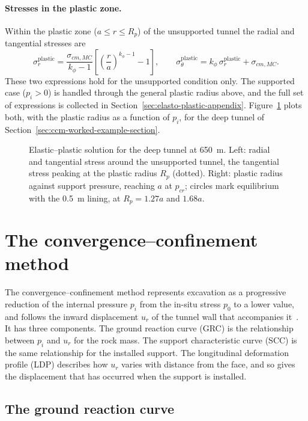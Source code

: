 \paragraph{Stresses in the plastic zone.}
Within the plastic zone ($a \leq r \leq R_p$) of the unsupported tunnel the
radial and tangential stresses are
\[
\sigma_r^{\text{plastic}} = \frac{\sigma_{cm,MC}}{k_\phi - 1}\left[\left(\frac{r}{a}\right)^{k_\phi-1} - 1\right],
\qquad
\sigma_\theta^{\text{plastic}} = k_\phi\,\sigma_r^{\text{plastic}} + \sigma_{cm,MC}.
\]
These two expressions hold for the unsupported condition only. The supported
case ($p_i > 0$) is handled through the general plastic radius above, and the
full set of expressions is collected in
Section~\ref{sec:elasto-plastic-appendix}. Figure~\ref{fig:plastic-zone}
plots both, with the plastic radius as a function of $p_i$, for the deep
tunnel of Section~\ref{sec:ccm-worked-example-section}.

\begin{figure}[htbp]
\centering
{}
\caption{Elastic--plastic solution for the deep tunnel at 650~m. Left: radial and tangential stress around the unsupported tunnel, the tangential stress peaking at the plastic radius $R_p$ (dotted). Right: plastic radius against support pressure, reaching $a$ at $p_{cr}$; circles mark equilibrium with the 0.5~m lining, at $R_p = 1.27a$ and $1.68a$.}
\label{fig:plastic-zone}
\end{figure}

\section{The convergence--confinement method}
\label{sec:the-convergence-confinement-method}

The convergence--confinement method represents excavation as a progressive
reduction of the internal pressure $p_i$ from the in-situ stress $p_0$ to a
lower value, and follows the inward displacement $u_r$ of the tunnel wall
that accompanies it~\citep{panet1995ccm,carranza2000ccm}. It has three
components. The ground reaction curve (GRC) is the relationship between $p_i$
and $u_r$ for the rock mass. The support characteristic curve (SCC) is the
same relationship for the installed support. The longitudinal deformation
profile (LDP) describes how $u_r$ varies with distance from the face, and so
gives the displacement that has occurred when the support is installed.

\subsection{The ground reaction curve}
\label{sec:ccm-components}

